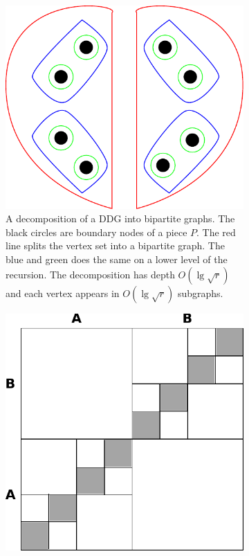 \begin{figure}[h!]
  \centering
  \caption{}
  \begin{subfigure}[b]{0.45\textwidth}
    \includegraphics[width=\textwidth]{figs/mongesubgraph.pdf}
    \caption{A decomposition of a DDG into bipartite graphs. The black circles are
    boundary nodes of a piece $P$. The red line splits the vertex set into a bipartite
  graph. The blue and green does the same on a lower level of the recursion. The
decomposition has depth $O(\lg \sqrt{r})$ and each vertex appears in $O(\lg \sqrt{r})$
subgraphs.}
    \label{mongesubgraph}
  \end{subfigure}
  \quad
  \begin{subfigure}[b]{0.45\textwidth}
    \includegraphics[width=\textwidth]{figs/mongematrix.pdf}

\end{subfigure}
\end{figure}
